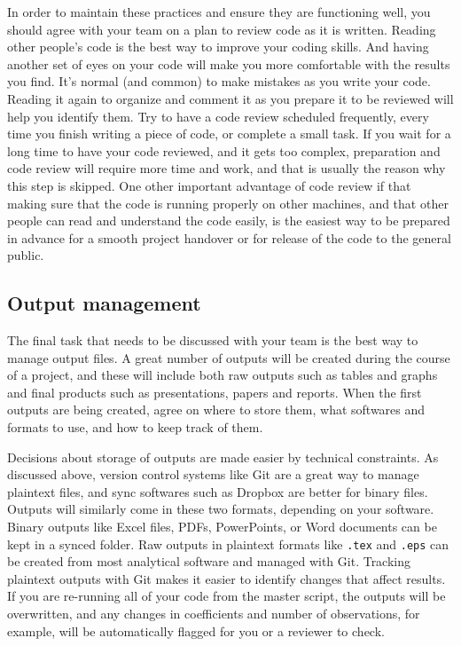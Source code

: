 In order to maintain these practices and ensure they are functioning well,
you should agree with your team on a plan to review code as it is written.
Reading other people's code is the best way to improve your coding skills.
And having another set of eyes on your code will make you more comfortable with the results you find.
It's normal (and common) to make mistakes as you write your code.
Reading it again to organize and comment it as you prepare it to be reviewed will help you identify them.
Try to have a code review scheduled frequently,
every time you finish writing a piece of code, or complete a small task.
If you wait for a long time to have your code reviewed, and it gets too complex,
preparation and code review will require more time and work,
and that is usually the reason why this step is skipped.
One other important advantage of code review if that
making sure that the code is running properly on other machines,
and that other people can read and understand the code easily,
is the easiest way to be prepared in advance for a smooth project handover
or for release of the code to the general public.

\subsection{Output management}

The final task that needs to be discussed with your team is the best way to manage output files.
A great number of outputs will be created during the course of a project,
and these will include both raw outputs such as tables and graphs
and final products such as presentations, papers and reports.
When the first outputs are being created, agree on where to store them,
what softwares and formats to use, and how to keep track of them.

Decisions about storage of outputs are made easier by technical constraints.
As discussed above, version control systems like Git are a great way to manage
plaintext files, and sync softwares such as Dropbox are better for binary files.
Outputs will similarly come in these two formats, depending on your software.
Binary outputs like Excel files, PDFs, PowerPoints, or Word documents can be kept in a synced folder.
Raw outputs in plaintext formats like \texttt{.tex} and \texttt{.eps}
can be created from most analytical software and managed with Git.
Tracking plaintext outputs with Git makes it easier to identify changes that affect results.
If you are re-running all of your code from the master script,
the outputs will be overwritten,
and any changes in coefficients and number of observations, for example,
will be automatically flagged for you or a reviewer to check.

